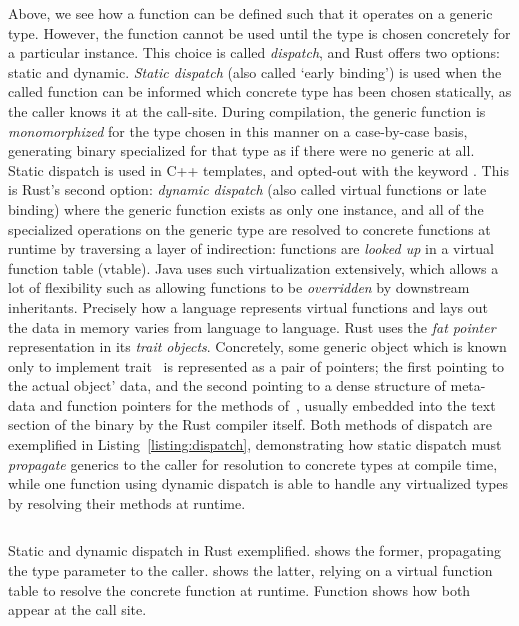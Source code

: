 Above, we see how a function can be defined such that it operates on a generic type. However, the function cannot be used until the type is chosen concretely for a particular instance. This choice is called \textit{dispatch}, and Rust offers two options: static and dynamic. \textit{Static dispatch} (also called `early binding') is used when the called function can be informed which concrete type has been chosen statically, as the caller knows it at the call-site. During compilation, the generic function is \textit{monomorphized} for the type chosen in this manner on a case-by-case basis, generating binary specialized for that type as if there were no generic at all. Static dispatch is used in C++ templates, and opted-out with the keyword . This is Rust's second option: \textit{dynamic dispatch} (also called virtual functions or late binding) where the generic function exists as only one instance, and all of the specialized operations on the generic type are resolved to concrete functions at runtime by traversing a layer of indirection: functions are \textit{looked up} in a virtual function table (vtable). Java uses such virtualization extensively, which allows a lot of flexibility such as allowing functions to be \textit{overridden} by downstream inheritants. Precisely how a language represents virtual functions and lays out the data in memory varies from language to language. Rust uses the \textit{fat pointer} representation in its \textit{trait objects}. Concretely, some generic object which is known only to implement trait~ is represented as a pair of pointers; the first pointing to the actual object' data, and the second pointing to a dense structure of meta-data and function pointers for the methods of~, usually embedded into the text section of the binary by the Rust compiler itself. Both methods of dispatch are exemplified in Listing~\ref{listing:dispatch}, demonstrating how static dispatch must \textit{propagate} generics to the caller for resolution to concrete types at compile time, while one function using dynamic dispatch is able to handle any virtualized types by resolving their methods at runtime.


\begin{listing}[ht]
	\centering
	\inputminted{rust}{dispatch.rs}
	\caption[Static vs dynamic dispatch in Rust.]{Static and dynamic dispatch in Rust exemplified.  shows the former, propagating the type parameter to the caller.  shows the latter, relying on a virtual function table to resolve the concrete function at runtime. Function  shows how both appear at the call site.}
	\label{listing:dispatch}
\end{listing}


